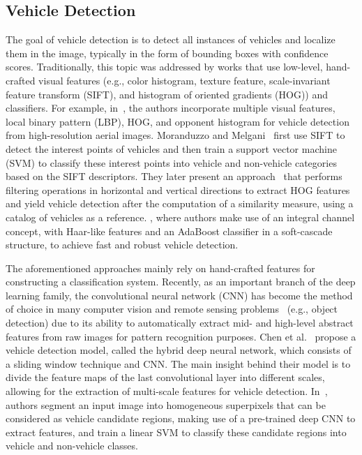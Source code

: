\documentclass[journal]{IEEEtran}
\begin{document}
\subsection{Vehicle Detection}
The goal of vehicle detection is to detect all instances of vehicles and localize them in the image, typically in the form of bounding boxes with confidence scores. Traditionally, this topic was addressed by works that use low-level, hand-crafted visual features (e.g., color histogram, texture feature, scale-invariant feature transform (SIFT), and histogram of oriented gradients (HOG)) and classifiers. For example, in~\cite{Shao12}, the authors incorporate multiple visual features, local binary pattern (LBP), HOG, and opponent histogram for vehicle detection from high-resolution aerial images. Moranduzzo and Melgani~\cite{Moranduzzo141} first use SIFT to detect the interest points of vehicles and then train a support vector machine (SVM) to classify these interest points into vehicle and non-vehicle categories based on the SIFT descriptors. They later present an approach~\cite{Moranduzzo142} that performs filtering operations in horizontal and vertical directions to extract HOG features and yield vehicle detection after the computation of a similarity measure, using a catalog of vehicles as a reference. \cite{KangLiu15}, where authors make use of an integral channel concept, with Haar-like features and an AdaBoost classifier in a soft-cascade structure, to achieve fast and robust vehicle detection.
\par
The aforementioned approaches mainly rely on hand-crafted features for constructing a classification system. Recently, as an important branch of the deep learning family, the convolutional neural network (CNN) has become the method of choice in many computer vision and remote sensing problems~\cite{Zhu17DLinRS,im2height,resconvdeconv,recnn,Mournn} (e.g., object detection) due to its ability to automatically extract mid- and high-level abstract features from raw images for pattern recognition purposes. Chen et al.~\cite{PanLetter14} propose a vehicle detection model, called the hybrid deep neural network, which consists of a sliding window technique and CNN. The main insight behind their model is to divide the feature maps of the last convolutional layer into different scales, allowing for the extraction of multi-scale features for vehicle detection. In~\cite{Ammour17}, authors segment an input image into homogeneous superpixels that can be considered as vehicle candidate regions, making use of a pre-trained deep CNN to extract features, and train a linear SVM to classify these candidate regions into vehicle and non-vehicle classes.
\end{document}

